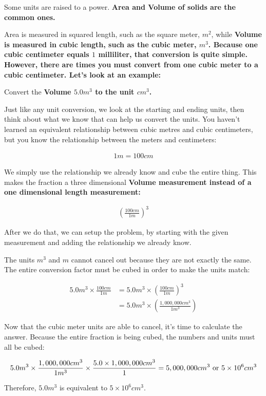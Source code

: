 \begin{example} Some units are raised to a power.
  \bf{Area} and \bf{Volume} of solids are the common ones.

  Area is measured in squared length, such as the square meter, $m^2$, while
  \bf{Volume} is measured in cubic length, such as the cubic meter, $m^3$.
  Because one cubic centimeter equals $1$ milliliter, that conversion is quite
  simple. However, there are times you must convert from one cubic meter to a
  cubic centimeter. Let's look at an example:

  Convert the \bf{Volume} $5.0 m^3$ to the unit $cm^3$.

  Just like any unit conversion, we look at the starting and ending units, then
  think about what we know that can help us convert the units. You haven't
  learned an equivalent relationship  between cubic metres and cubic
  centimeters, but you know the relationship between the meters and
  centimeters:

  \begin{align}
    1 m = 100 cm
  \end{align}

  We simply use the relationship we already know and cube the entire thing.
  This makes the fraction a three dimensional \bf{Volume} measurement
  instead of a one dimensional length measurement:

  \begin{align}
    \left( \frac{100 cm}{1 m}\right)^3
  \end{align}

  After we do that, we can setup the problem, by starting with the given
  measurement and adding the relationship we already know.

  The units $m^3$ and $m$ cannot cancel out because they are not exactly the
  same. The entire conversion factor must be cubed in order to make the units
  match:

  \begin{align}
    5.0 m^3 \times \frac{100 cm}{1 m} &= 5.0 m^3 \times \left( \frac{100 cm}{1 m} \right)^3 \\
                                      &= 5.0 m^3 \times \left( \frac{1,000,000 cm^3}{1 m^3} \right)
  \end{align}

  Now that the cubic meter units are able to cancel, it's time to calculate the
  answer. Because the entire fraction is being cubed, the numbers and units must
  all be cubed:

  \begin{align}
    5.0 m^3 \times \frac{1,000,000 cm^3}{1 m^3} \times \frac{5.0 \times 1,000,000 cm^3}{1} = 5,000,000 cm^3 \rm{ or } 5 \times 10^6 cm^3
  \end{align}

  Therefore, $5.0 m^3$ is equivalent to $5 \times 10^6 cm^3$.
\end{example}

\newpage
